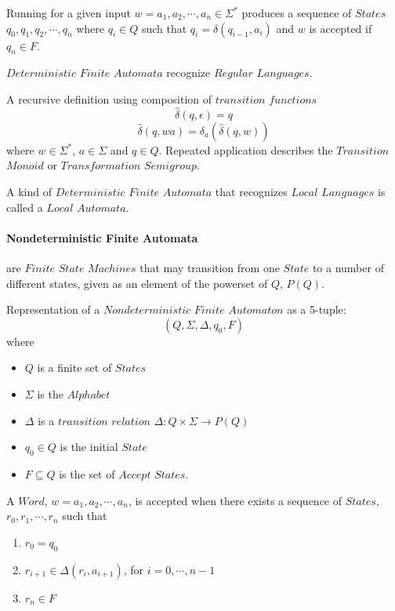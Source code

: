 \documentclass{article}
\begin{document}
    Running for a given input $w = a_1,a_2, \cdots , a_n \in \Sigma^*$
    produces a sequence of $States$ $q_0,q_1,q_2,\cdots , q_n$ where
    $q_i \in Q$ such that $q_i = \delta (q_{i-1},a_i)$ and $w$ is
    accepted if $q_n \in F$.

    $Deterministic$ $Finite$ $Automata$ recognize $Regular$ $Languages$.

    A recursive definition using composition of $transition$ $functions$
    \[
        \widehat{\delta}(q,\epsilon) = q
    \]\[
        \widehat{\delta}(q,wa) = \delta_a(\widehat{\delta}(q,w))
    \]
    where $w \in \Sigma^*$, $a \in \Sigma$ and $q \in Q$. Repeated
    application describes the $Transition$ $Monoid$ or
    $Transformation$ $Semigroup$.

    A kind of $Deterministic$ $Finite$ $Automata$ that recognizes
    $Local$ $Languages$ is called a $Local$ $Automata$.

    \paragraph{Nondeterministic Finite Automata} are $Finite$ $State$
    $Machines$ that may transition from one $State$ to a number of
    different states, given as an element of the powerset of $Q$,
    $P(Q)$.

    Representation of a $Nondeterministic$ $Finite$ $Automaton$ as a 5-tuple:
    \[
        (Q,\Sigma,\Delta,q_0,F)
    \]
    where
    \begin{itemize}
    \item $Q$ is a finite set of $States$
    \item $\Sigma$ is the $Alphabet$
    \item $\Delta$ is a $transition$ $relation$ $\Delta: Q \times
      \Sigma \rightarrow P(Q)$
    \item $q_0 \in Q$ is the initial $State$
    \item $F \subseteq Q$ is the set of $Accept$ $States$.
    \end{itemize}

    A $Word$, $w=a_1,a_2,\cdots,a_n$, is accepted when there exists a
    sequence of $States$, $r_0,r_1,\cdots,r_n$ such that
    \begin{enumerate}
    \item $r_0 = q_0$
    \item $r_{i+1} \in \Delta(r_i, a_{i+1})$, for $i = 0, \cdots, n-1$
    \item $r_n \in F$
    \end{enumerate}
\end{document}
